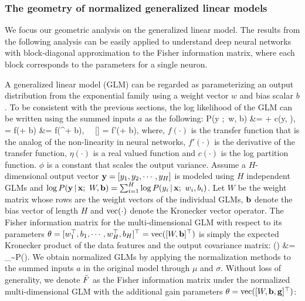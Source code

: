 \documentclass{article}
\begin{document}
\subsubsection{The geometry of normalized generalized linear models}
We focus our geometric analysis on the generalized linear model. The results from the following analysis can be easily applied to understand deep neural networks with block-diagonal approximation to the Fisher information matrix, where each block corresponds to the parameters for a single neuron. 

A generalized linear model (GLM) can be regarded as parameterizing an output distribution from the exponential family using a weight vector $w$ and bias scalar $b$. To be consistent with the previous sections, the log likelihood of the GLM can be written using the summed inputs $a$ as the following:
\bea
\log P(y \given \data ;\  w, b) &=  + c(y, \phi),\\
 = f(\act + b) &= f(\weights^\T \data + b), \ \  [\target \given \data] = \phi f'(\act + b),
\eea
where, $f(\cdot)$ is the transfer function that is the analog of the non-linearity in neural networks, $f'(\cdot)$ is the derivative of the transfer function, $\eta(\cdot)$ is a real valued function and $c(\cdot)$ is the log partition function. $\phi$ is a constant that scales the output variance.
Assume a $H$-dimensional output vector ${\bold y} = [y_1, y_2, \cdots, y_H]$ is modeled using $H$ independent GLMs and $\log P({\bold y} \,|\, {\bold x} ;\ W, {\bold b}) = \sum_{i=1}^H \log P(y_i \,|\, {\bold x} ;\ w_i, b_i) $. Let $W$ be the weight matrix whose rows are the weight vectors of the individual GLMs, ${\bold b}$ denote the bias vector of length $H$ and $\operatorname{vec}(\cdot)$ denote the Kronecker vector operator.
The Fisher information matrix for the multi-dimensional GLM with respect to its parameters $\theta=[{w}_1^\top, {b}_1,\cdots,{w}_H^\top, {b}_H]^\top = \operatorname{vec}([W, {\bold b}]^\top)$ is simply the expected Kronecker product of the data features and the output covariance matrix: 
\bea
\fisher(\theta) &= \expectation_{\data \sim P(\data)}.
\eea
We obtain normalized GLMs by applying the normalization methods to the summed inputs $a$ in the original model through $\mu$ and $\sigma$. Without loss of generality, we denote $\bar{{F}}$ as the Fisher information matrix under the normalized multi-dimensional GLM with the additional gain parameters $\theta=\operatorname{vec}([W, {\bold b}, {\bold g}]^\top)$:
\end{document}
